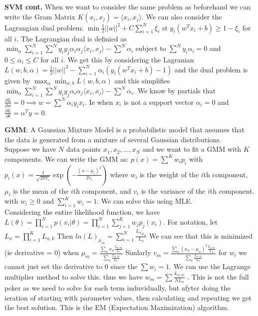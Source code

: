 \documentclass[answers,12pt,addpoints]{exam}
\begin{document}
\textbf{SVM cont.} When we want to consider the same problem as beforehand we can write the Gram Matrix $K(x_i, x_j) = \langle x_i, x_j \rangle$. We can also consider the Lagrangian dual problem: $\min \frac{1}{2} || w||^2 + C \sum_{i=1}^N \xi_i$ st $y_i (w^T x_i + b) \geq 1 - \xi_i$ for all $i$. The Lagrangian dual  is definied as $\min_{\alpha} \sum_{i=1}^N \sum^N y_i y_j \alpha_i \alpha_j \langle x_i, x_j \rangle - \sum^N \alpha_i $ subject to $\sum^N y_i \alpha_i = 0$ and $0 \leq \alpha_i \leq C$ for all $i$. We get this by considering the Lagranian $L(w, b, \alpha) = \frac{1}{2} ||w||^2 - \sum_{i=1}^N \alpha_i (y_i (w^T x_i + b) - 1)$ and the dual problem is given by $\max_{\alpha} \min_{w,b} L(w, b, \alpha)$ and this simplifies $\min_{\alpha} \sum_{i=1}^N \sum^N y_i y_j \alpha_i \alpha_j \langle x_i, x_j \rangle - \sum^N \alpha_i$. We know by partials that $\frac{\partial L}{\partial w} = 0 \implies w = \sum^N \alpha_i y_i x_i$. Ie when $x_i$ is not a support vector $\alpha_i = 0$ and $\frac{\partial L}{\partial b} = \alpha^T y = 0$.  

\newpage

\textbf{GMM}: A Gaussian Mixture Model is a probabilistic model that assumes that the data is generated from a mixture of several Gaussian distributions. \\
Suppose we have $N$ data points $x_1, x_2, \ldots, x_N$ and we want to fit a GMM with $K$ components. We can write the GMM as: $p(x) = \sum^K w_i p_i$ with $p_i(x) = \frac{1}{\sqrt{2\pi v_i}} \exp(-\frac{(x - \mu_i)^2}{2v_i})$ where $w_i$ is the weight of the $i$th component, $\mu_i$ is the mean of the $i$th component, and $v_i$ is the variance of the $i$th component. with $w_i \geq 0$ and $\sum_{i=1}^K w_i = 1$. We can solve this using MLE. \\
Considering the entire likelihood function, we have $L(\theta) = \prod_{i=1}^N p(x_i | \theta) = \prod_{i=1}^N \sum_{j=1}^K w_j p_j(x_i)$. For notation, let $L_n = \prod_{i=1}^K L_{n,k}$
Then $ln(L)_{\mu_m} = \sum_{i=1}^N \frac{{L_n}_{\mu_m}}{L_n}$
We can see that this is minimized (ie derivative = 0) when $\mu_m = \frac{\sum_n x_n \frac{L_{n,m}}{L_n}}{\sum_n \frac{L_{n,m}}{L_n}}$ Simlarly  $v_m =\frac{\sum_n (x_n- \mu_n)^2 \frac{L_{n,m}}{L_n}}{\sum_n \frac{L_{n,m}}{L_n}}$ for $w_i$ we cannot just set the derivative to 0 since the $\sum w_i = 1$. We can use the Lagrange multiplier method to solve this. thus we have $w_m = 
\sum \frac{L_{n,m}}{N L_n}$ . This is not the full pcker as we need to solve for each term induvidually, but afyter doing the ieration of starting with parameter values, then calculating and repeating we get the best solution. This is the EM (Expectation Maximization) algorithm.\\
\end{document}
